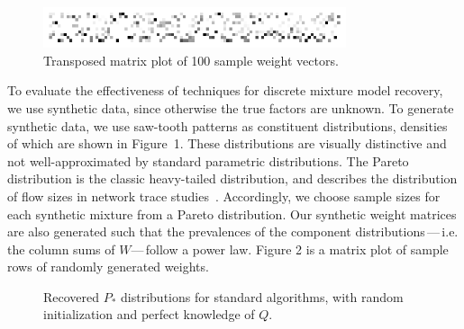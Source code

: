 \documentclass[conference]{IEEEtran}
\begin{document}
\begin{figure}[b]
\begin{center}
\includegraphics[width=3.5in]{synth/weights}
\end{center}
\vspace{-0.7em}
\caption{Transposed matrix plot of 100 sample weight vectors.}
\vspace{-0.3em}
\end{figure}

To evaluate the effectiveness of  techniques for discrete mixture model recovery, we use synthetic data, since otherwise the true factors are unknown.
To generate synthetic data, we use saw-tooth patterns as constituent distributions, densities of which are shown in Figure~1.
These distributions are visually distinctive and not well-approximated by standard parametric distributions.
The Pareto distribution is the classic heavy-tailed distribution, and describes the distribution of flow sizes in network trace studies~\cite{Hernandez06:spatio-temporal-modeling,Karaliopoulos07}.
Accordingly, we choose sample sizes for each synthetic mixture from a Pareto distribution.
Our synthetic weight matrices are also generated such that the prevalences of the component distributions\,---\,i.e. the column sums of $W$---\,follow a power law. Figure 2 is a matrix plot of sample rows of randomly generated weights.

\begin{figure}[t]
\begin{center}
\end{center}
\caption{Recovered $P_*$ distributions for standard  algorithms, with random initialization and perfect knowledge of $Q$.}
\end{figure}
\end{document}
